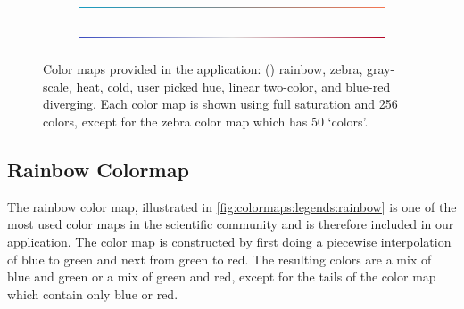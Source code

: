 \begin{figure}[b]
\begin{subfigure}{1\textwidth}
\begin{minipage}[l]{0.95\textwidth}
  		\end{minipage}
  	\end{subfigure}
  	\begin{subfigure}{1\textwidth}
  		\begin{minipage}[l]{0.05\textwidth}
    		\caption{} \label{fig:colormaps:legends::twocolors}
  		\end{minipage}
  	\hfill
  		\begin{minipage}[l]{0.95\textwidth}
    		\includegraphics[width=\textwidth,height=15px,keepaspectratio=false,frame]{colormapping/img/colormap_legends/twocolorscolormap.png}
  		\end{minipage}
  	\end{subfigure}
  	\begin{subfigure}{1\textwidth}
  		\begin{minipage}[l]{0.05\textwidth}
    		\caption{} \label{fig:colormaps:legends::diverging}
  		\end{minipage}
  	\hfill
  		\begin{minipage}[l]{0.95\textwidth}
    		\includegraphics[width=\textwidth,height=15px,keepaspectratio=false,frame]{colormapping/img/colormap_legends/divergingcolormap.png}
  		\end{minipage}
  	\end{subfigure}
\caption{Color maps provided in the application: 
() rainbow, 
 zebra,
 gray-scale,
 heat,
 cold,
 user picked hue,
 linear two-color, and
 blue-red diverging. Each color map is shown using full saturation and 256 colors, except for the zebra color map which has 50 `colors'. }
\label{fig:colormaps:legends}
\end{figure}


\subsection{Rainbow Colormap} %
\label{ssub:rainbow_colormap}
The rainbow color map, illustrated in \cref{fig:colormaps:legends:rainbow} is one of the most used color maps in the scientific community and is therefore included in our application. The color map is constructed by first doing a piecewise interpolation of blue to green and next from green to red. The resulting colors are a mix of blue and green or a mix of green and red, except for the tails of the color map which contain only blue or red.

